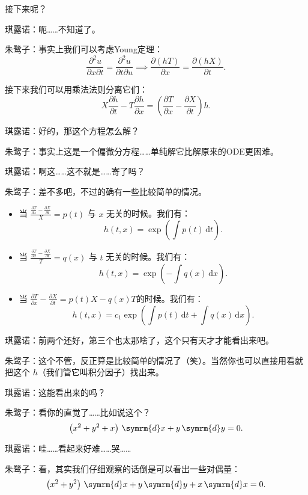 \documentclass{ctexart}
\begin{document}
接下来呢？

琪露诺：呃……不知道了。

朱鹭子：事实上我们可以考虑Young定理：
\[
    \frac{\partial ^2u}{\partial x \partial t}=\frac{\partial ^2u}{\partial t \partial u}\implies \frac{\partial (hT)}{\partial x}=\frac{\partial (hX)}{\partial t}
    .\]

接下来我们可以用乘法法则分离它们：
\[
    X \frac{\partial h}{\partial t}-T \frac{\partial h}{\partial x}=\left( \frac{\partial T}{\partial x}-\frac{\partial X}{\partial t} \right) h
    .\]

琪露诺：好的，那这个方程怎么解？

朱鹭子：事实上这是一个偏微分方程……单纯解它比解原来的ODE更困难。

琪露诺：啊这……这不就是……寄了吗？

朱鹭子：差不多吧，不过的确有一些比较简单的情况。

\begin{itemize}
    \item 当 \( \frac{\frac{\partial T}{\partial x}-\frac{\partial X}{\partial t}}{X} =p(t)\) 与 \(x\) 无关的时候。我们有：
          \[
              h(t,x)=\exp \left( \int p(t)\,\mathrm{d}t  \right)
              .\]
    \item 当 \( \frac{\frac{\partial T}{\partial x}-\frac{\partial X}{\partial t}}{T} =q(x)\) 与 \(t\) 无关的时候。我们有：
          \[
              h(t,x)=\exp \left(- \int q(x)\,\mathrm{d}x \right)
              .\]
    \item 当 \( {\frac{\partial T}{\partial x}-\frac{\partial X}{\partial t}}=p(t)X-q(x)T\)的时候。我们有：
          \[
              h(t,x)=c_1 \exp \left( \int p(t) \,\mathrm{d}t +\int q(x) \,\mathrm{d}x  \right)
              .\]
\end{itemize}

琪露诺：前两个还好，第三个也太那啥了，这个只有天才才能看出来吧。

朱鹭子：这个不管，反正算是比较简单的情况了（笑）。当然你也可以直接用看就把这个 \(h\)（我们管它叫积分因子）找出来。

琪露诺：这能看出来的吗？

朱鹭子：看你的直觉了……比如说这个？
\[
    \left( x^2 +y^2 +x \right) \,\symrm{d} x +y \,\symrm{d} y=0
    .\]

琪露诺：哇……看起来好难……哭……

朱鹭子：看，其实我们仔细观察的话倒是可以看出一些对偶量：
\[
    \left( x^2 +y^2  \right) \,\symrm{d} x +y \,\symrm{d} y+ x \,\symrm{d} x=0
    .\]
\end{document}
